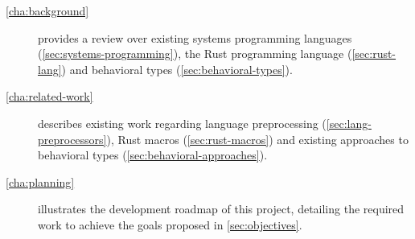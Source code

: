 \begin{description}
    \item [\autoref{cha:background}] provides a review over
          existing systems programming languages (\autoref{sec:systems-programming}),
          the Rust programming language (\autoref{sec:rust-lang}) and
          behavioral types (\autoref{sec:behavioral-types}).
    \item [\autoref{cha:related-work}] describes existing work regarding
          language preprocessing (\autoref{sec:lang-preprocessors}),
          Rust macros (\autoref{sec:rust-macros}) and
          existing approaches to behavioral types (\autoref{sec:behavioral-approaches}).
    \item [\autoref{cha:planning}] illustrates the development roadmap of this project,
          detailing the required work to achieve the goals proposed in \autoref{sec:objectives}.
\end{description}